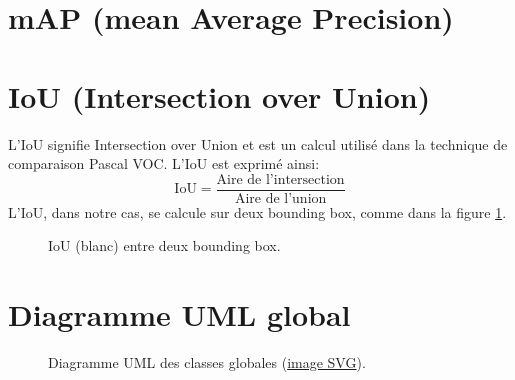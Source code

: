 \begin{appendices}
	
\section*{mAP (mean Average Precision)}\label{app:mAP}
	
	
\section*{IoU (Intersection over Union)}\label{app:IoU}
L'IoU signifie Intersection over Union et est un calcul utilisé dans la technique de comparaison Pascal VOC.
L'IoU est exprimé ainsi:
$$\text{IoU} = \frac{\text{Aire de l'intersection}}{\text{Aire de l'union}}$$
L'IoU, dans notre cas, se calcule sur deux bounding box, comme dans la figure \ref{fig:iou_example}.
\begin{figure}[!htbp]
\center
\caption{IoU (blanc) entre deux bounding box.}
\label{fig:iou_example}
\end{figure}
\FloatBarrier
	
	
	
\clearpage
\section*{Diagramme UML global}\label{app:UMLGlobal}
\begin{figure}[!htbp]
	\center
	\caption{Diagramme UML des classes globales (\href{https://github.com/gabriel-combe/PP2_Particle_Filter/blob/test/rapport/UML/classes.svg}{image SVG}).}
	\label{fig:uml_diagram_classes}
\end{figure}
\FloatBarrier
	
	
	
	

\end{appendices}
